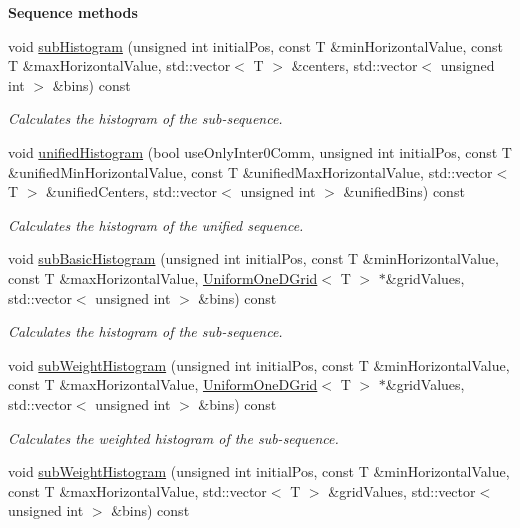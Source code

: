 \begin{Indent}{\bf Sequence methods}
\begin{DoxyCompactItemize}
void \hyperlink{class_q_u_e_s_o_1_1_scalar_sequence_a80e9aa5156dfaedbdc5ecd0fee6acb9f}{sub\-Histogram} (unsigned int initial\-Pos, const T \&min\-Horizontal\-Value, const T \&max\-Horizontal\-Value, std\-::vector$<$ T $>$ \&centers, std\-::vector$<$ unsigned int $>$ \&bins) const 
\begin{DoxyCompactList}\small\item\em Calculates the histogram of the sub-\/sequence. \end{DoxyCompactList}\item 
void \hyperlink{class_q_u_e_s_o_1_1_scalar_sequence_a805023aa45f97a89c19a5f5d0cc7db34}{unified\-Histogram} (bool use\-Only\-Inter0\-Comm, unsigned int initial\-Pos, const T \&unified\-Min\-Horizontal\-Value, const T \&unified\-Max\-Horizontal\-Value, std\-::vector$<$ T $>$ \&unified\-Centers, std\-::vector$<$ unsigned int $>$ \&unified\-Bins) const 
\begin{DoxyCompactList}\small\item\em Calculates the histogram of the unified sequence. \end{DoxyCompactList}\item 
void \hyperlink{class_q_u_e_s_o_1_1_scalar_sequence_aff0ffa9ef443c766c5ee0e36457c0c2d}{sub\-Basic\-Histogram} (unsigned int initial\-Pos, const T \&min\-Horizontal\-Value, const T \&max\-Horizontal\-Value, \hyperlink{class_q_u_e_s_o_1_1_uniform_one_d_grid}{Uniform\-One\-D\-Grid}$<$ T $>$ $\ast$\&grid\-Values, std\-::vector$<$ unsigned int $>$ \&bins) const 
\begin{DoxyCompactList}\small\item\em Calculates the histogram of the sub-\/sequence. \end{DoxyCompactList}\item 
void \hyperlink{class_q_u_e_s_o_1_1_scalar_sequence_a23e38a89b7dba988b244f05a8b454cd8}{sub\-Weight\-Histogram} (unsigned int initial\-Pos, const T \&min\-Horizontal\-Value, const T \&max\-Horizontal\-Value, \hyperlink{class_q_u_e_s_o_1_1_uniform_one_d_grid}{Uniform\-One\-D\-Grid}$<$ T $>$ $\ast$\&grid\-Values, std\-::vector$<$ unsigned int $>$ \&bins) const 
\begin{DoxyCompactList}\small\item\em Calculates the weighted histogram of the sub-\/sequence. \end{DoxyCompactList}\item 
void \hyperlink{class_q_u_e_s_o_1_1_scalar_sequence_af586092d2550315ffbb7627779ab6eab}{sub\-Weight\-Histogram} (unsigned int initial\-Pos, const T \&min\-Horizontal\-Value, const T \&max\-Horizontal\-Value, std\-::vector$<$ T $>$ \&grid\-Values, std\-::vector$<$ unsigned int $>$ \&bins) const 

\end{DoxyCompactItemize}
\end{Indent}
